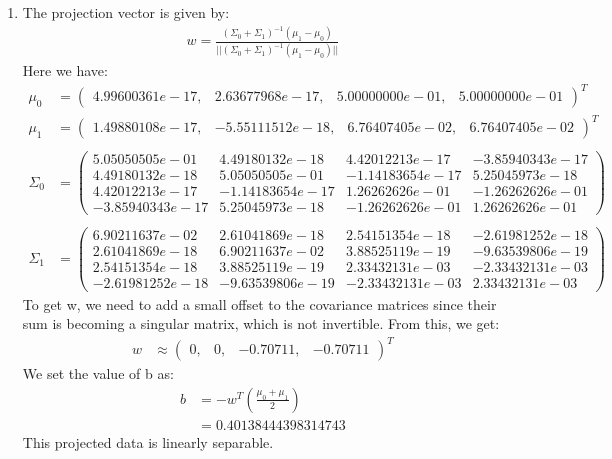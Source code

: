 \documentclass[12pt]{article}
\begin{document}
\begin{enumerate}
    \vspace*{0.5cm}
    \item The projection vector is given by:
    \begin{align*}
        w = \frac{(\Sigma_0 + \Sigma_1)^{-1}(\mu_1 - \mu_0)}{||(\Sigma_0 + \Sigma_1)^{-1}(\mu_1 - \mu_0)||}
    \end{align*}
    Here we have:
    \begin{align*}
        \mu_0 &= \begin{pmatrix}
            4.99600361e-17, & 2.63677968e-17, & 5.00000000e-01, & 5.00000000e-01
        \end{pmatrix}^T \\
        \mu_1 &= \begin{pmatrix}
            1.49880108e-17, & -5.55111512e-18, & 6.76407405e-02, & 6.76407405e-02
        \end{pmatrix}^T \\ \\ 
        \Sigma_0 &= \begin{pmatrix}
            5.05050505e-01 & 4.49180132e-18 & 4.42012213e-17 & -3.85940343e-17 \\
            4.49180132e-18 & 5.05050505e-01 & -1.14183654e-17 & 5.25045973e-18 \\
            4.42012213e-17 & -1.14183654e-17 & 1.26262626e-01 & -1.26262626e-01 \\
            -3.85940343e-17 & 5.25045973e-18 & -1.26262626e-01 & 1.26262626e-01
        \end{pmatrix} \\ \\
        \Sigma_1 &= \begin{pmatrix}
            6.90211637e-02 & 2.61041869e-18 & 2.54151354e-18 & -2.61981252e-18 \\
            2.61041869e-18 & 6.90211637e-02 & 3.88525119e-19 & -9.63539806e-19 \\
            2.54151354e-18 & 3.88525119e-19 & 2.33432131e-03 & -2.33432131e-03 \\
            -2.61981252e-18 & -9.63539806e-19 & -2.33432131e-03 & 2.33432131e-03
        \end{pmatrix}
    \end{align*}
    To get w, we need to add a small offset to the covariance matrices since their sum is becoming a singular matrix, which is not invertible. From this, we get:
    \begin{align*}
        w &\approx \begin{pmatrix}
            0, & 0, & -0.70711, & -0.70711
        \end{pmatrix}^T
    \end{align*}
    We set the value of b as:
    \begin{align*}
        b &= -w^T(\frac{\mu_0 + \mu_1}{2}) \\
        &= 0.40138444398314743
    \end{align*}
    This projected data is linearly separable.


\end{enumerate}
\end{document}
